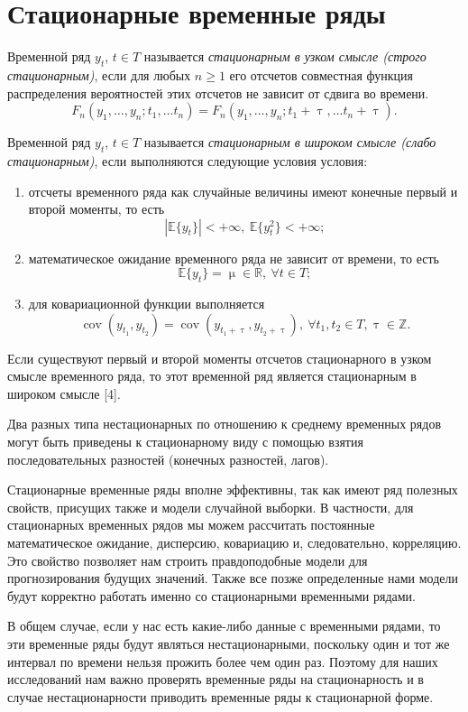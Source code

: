 \documentclass[a4paper, 14pt]{extreport}
\numberwithin{equation}{subsection}
\newcommand{\Rm}{\mathbb{R}}
\newcommand{\Z}{\mathbb{Z}}
\renewcommand{\geq}{\geqslant}
\renewcommand{\tau}{\uptau}
\renewcommand{\mu}{\upmu}
\newcommand{\cov}{\operatorname{cov}}
\numberwithin{equation}{section}
\begin{document}
	\section{Стационарные временные ряды}
	
	Временной ряд $y_t$, $t \in T$ называется \textit{стационарным в узком смысле (строго стационарным)}, если для любых $n\geq 1$ его отсчетов совместная функция распределения вероятностей этих отсчетов не зависит от сдвига во времени. 
	\begin{equation}
		F_n(y_1,\ldots, y_n; t_1 ,\ldots t_n) = F_n(y_1,\ldots, y_n; t_1 + \tau,\ldots t_n+\tau).
	\end{equation}
	
	Временной ряд $y_t$, $t \in T$ называется \textit{стационарным в широком смысле (слабо стационарным)}, если выполняются следующие условия условия:\begin{enumerate}
			\item отсчеты временного ряда как случайные величины имеют конечные первый и второй моменты, то есть $$|\mathbb E \{y_t\}|<+\infty,\ \mathbb E \{y_t^2\}<+\infty;$$
			\item математическое ожидание временного ряда не зависит от времени, то есть $$\mathbb E \{y_t\} = \mu \in \Rm,\ \forall t \in T;$$
			\item для ковариационной функции выполняется $$\cov(y_{t_1},y_{t_2}) = \cov(y_{t_1 + \tau}, y_{t_2 + \tau}),\ \forall t_1, t_2 \in T, \tau \in \Z.$$
	\end{enumerate}
	
	Если существуют первый и второй моменты отсчетов стационарного в узком смысле временного ряда, то этот временной ряд является стационарным в широком смысле [4].
	
	Два разных типа нестационарных по отношению к среднему временных
	рядов могут быть приведены к стационарному виду с помощью взятия
	последовательных разностей (конечных разностей, лагов).
	
	Стационарные временные ряды вполне эффективны, так как имеют ряд полезных свойств, присущих также и модели случайной выборки. В частности, для стационарных временных рядов мы можем рассчитать постоянные математическое ожидание, дисперсию, ковариацию и, следовательно, корреляцию. Это свойство позволяет нам строить правдоподобные модели для прогнозирования будущих значений. Также все позже определенные нами модели будут корректно работать именно со стационарными временными рядами.
	
	В общем случае, если у нас есть какие-либо данные с временными рядами, то эти временные ряды будут являться нестационарными, поскольку один и тот же интервал по времени нельзя прожить более чем один раз. Поэтому для наших исследований нам важно проверять временные ряды на стационарность и в случае нестационарности приводить временные ряды к стационарной форме.
	
\end{document}
